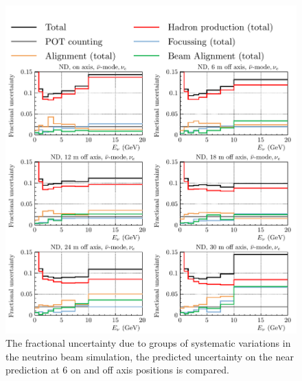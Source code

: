 \documentclass{article}
\begin{document}
\begin{figure}
  \centering
  \includegraphics[width=\textwidth]{plots/fracerrs/nubarmode_nue_ErrType_OffAxis}
  \caption{The fractional uncertainty due to groups of systematic variations in the neutrino beam simulation, the predicted uncertainty on the near prediction at 6 on and off axis positions is compared.}
  \label{fig:grp_nubar_nue_offaxis}
\end{figure}
\end{document}
